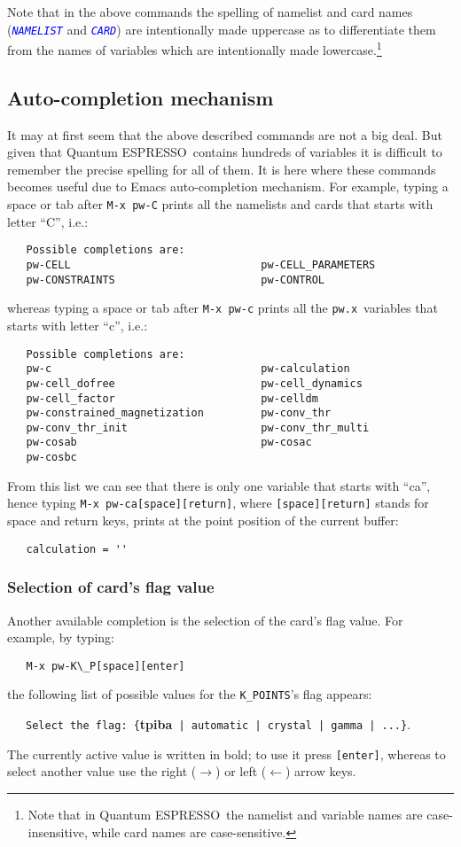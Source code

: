 \documentclass[12pt,a4paper]{article}
\def\qe{{\sc Quantum ESPRESSO}}
\def\pwx{\texttt{pw.x}}
\def\var#1{\textcolor{Blue}{\texttt{\textit{#1}}}}
\begin{document}
Note that in the above commands the spelling of namelist and card
names (\var{NAMELIST} and \var{CARD}) are intentionally made uppercase
as to differentiate them from the names of variables which are
intentionally made lowercase.\footnote{Note that in \qe\ the namelist
  and variable names are case-insensitive, while card names are
  case-sensitive.}

\subsection{Auto-completion mechanism}
It may at first seem that the above described commands are not a big
deal. But given that \qe\ contains hundreds of variables it is
difficult to remember the precise spelling for all of them. It is here
where these commands becomes useful due to Emacs auto-completion
mechanism. For example, typing a space or tab after \texttt{M-x pw-C} 
prints all the namelists and cards that starts with letter ``C'', i.e.:
\begin{verbatim}
   Possible completions are:
   pw-CELL                              pw-CELL_PARAMETERS
   pw-CONSTRAINTS                       pw-CONTROL
\end{verbatim}
\noindent whereas typing a space or tab after \texttt{M-x pw-c}
prints all the \pwx\ variables that starts with letter ``c'', i.e.:
\begin{verbatim}
   Possible completions are:
   pw-c                                 pw-calculation
   pw-cell_dofree                       pw-cell_dynamics
   pw-cell_factor                       pw-celldm
   pw-constrained_magnetization         pw-conv_thr
   pw-conv_thr_init                     pw-conv_thr_multi
   pw-cosab                             pw-cosac
   pw-cosbc
\end{verbatim}
\noindent
From this list we can see that there is only one variable that starts
with ``ca'', hence typing \texttt{M-x pw-ca[space][return]}, where
\texttt{[space][return]} stands for space and return keys, prints at
the point position of the current buffer:
\begin{verbatim}
   calculation = ''
\end{verbatim}

\subsubsection{Selection of card's flag value}

Another available completion is the selection of the card's flag
value. For example, by typing:
\begin{verbatim}
   M-x pw-K\_P[space][enter]
\end{verbatim}
the following list of possible values for the \verb+K_POINTS+'s flag
appears:
\begin{flushleft}
~~~\texttt{Select the flag: \{}\textbf{tpiba}\texttt{ | automatic |
  crystal | gamma | ...\}}.
\end{flushleft}
The currently active value is written in
bold; to use it press \texttt{[enter]}, whereas to select another
value use the right ($\rightarrow$) or left ($\leftarrow$) arrow keys.
\end{document}
